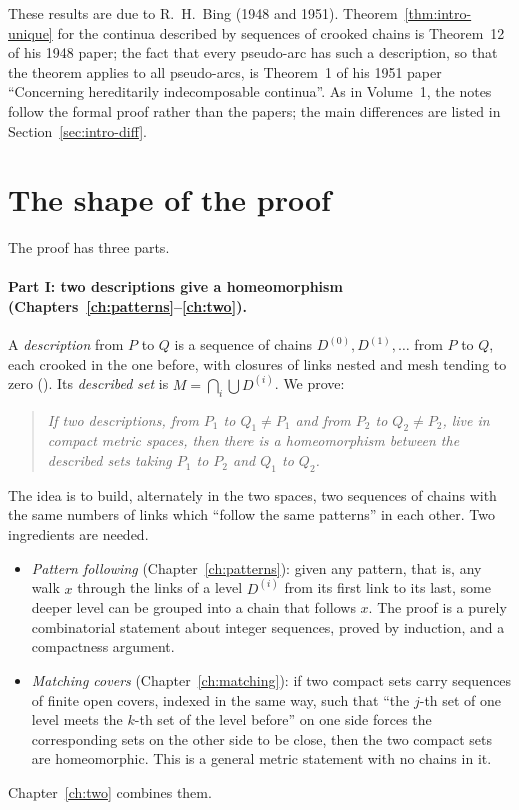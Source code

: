 These results are due to R.~H.~Bing (1948 and 1951). Theorem~\ref{thm:intro-unique} for
the continua described by sequences of crooked chains is Theorem~12 of his 1948 paper; the
fact that every pseudo-arc has such a description, so that the theorem applies to all
pseudo-arcs, is Theorem~1 of his 1951 paper ``Concerning hereditarily indecomposable
continua''. As in Volume~1, the notes follow the formal proof rather than the papers; the main
differences are listed in Section~\ref{sec:intro-diff}.

\section{The shape of the proof}

The proof has three parts.

\paragraph{Part I: two descriptions give a homeomorphism (Chapters~\ref{ch:patterns}--\ref{ch:two}).}
A \emph{description} from $P$ to $Q$ is a sequence of chains $D^{(0)},D^{(1)},\dots$ from $P$ to
$Q$, each crooked in the one before, with closures of links nested and mesh tending to zero
(). Its \emph{described set} is $M=\bigcap_i\bigcup D^{(i)}$. We prove:

\begin{quote}
\emph{If two descriptions, from $P_1$ to $Q_1\ne P_1$ and from $P_2$ to $Q_2\neq P_2$, live in
compact metric spaces, then there is a homeomorphism between the described sets taking $P_1$
to $P_2$ and $Q_1$ to $Q_2$.}
\end{quote}

The idea is to build, alternately in the two spaces, two sequences of chains with the same
numbers of links which ``follow the same patterns'' in each other. Two ingredients are
needed.
\begin{itemize}
\item \emph{Pattern following} (Chapter~\ref{ch:patterns}): given any pattern, that is, any walk
$x$ through the links of a level $D^{(i)}$ from its first link to its last, some deeper level
can be grouped into a chain that follows $x$. The proof is a purely combinatorial statement
about integer sequences, proved by induction, and a compactness argument.
\item \emph{Matching covers} (Chapter~\ref{ch:matching}): if two compact sets carry sequences of
finite open covers, indexed in the same way, such that ``the $j$-th set of one level meets the
$k$-th set of the level before'' on one side forces the corresponding sets on the other side to
be close, then the two compact sets are homeomorphic. This is a general metric statement with
no chains in it.
\end{itemize}
Chapter~\ref{ch:two} combines them.

